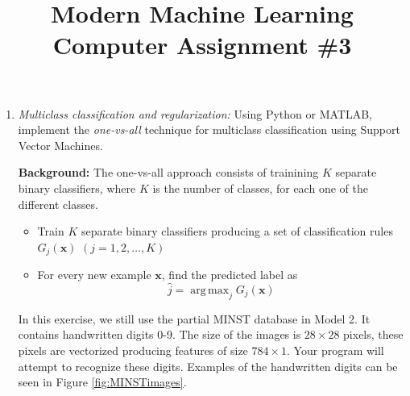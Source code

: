 \documentclass[11pt,oneside,a4paper]{article}
\DeclareMathOperator*{\argmax}{arg\,max}
\begin{document}
\title{Modern Machine Learning \\Computer Assignment \#3}
\date{\vspace{-5ex}}
\maketitle
\begin{enumerate}
  \item \textit{Multiclass classification and regularization:} Using Python or MATLAB, implement the \textit{one-vs-all} technique for multiclass classification using Support Vector Machines.
  
  \textbf{Background:} The one-vs-all approach consists of trainining $K$ separate binary classifiers, where $K$ is the number of classes, for each one of the different classes. 
  \begin{itemize}\nonumber
    \item Train $K$ separate binary classifiers producing a set of classification rules $G_j(\mathbf{x})$ $(j=1,2,\dots,K)$ 
    \item For every new example $\textbf{x}$, find the predicted label as
    \begin{equation}\nonumber
    \hat{j}=\argmax_{j} G_j(\mathbf{x})
    \end{equation}
  \end{itemize}  
  
In this exercise, we still use the partial MINST database in Model 2. It contains handwritten digits 0-9. The size of the images is $28\times 28$ pixels, these pixels are vectorized producing features of size $784\times1$. Your program will attempt to recognize these digits. Examples of the handwritten digits can be seen in Figure \ref{fig:MINSTimages}.



\end{enumerate}
\end{document}
